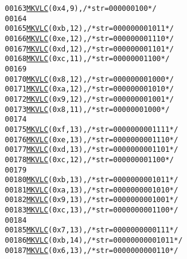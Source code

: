 \begin{footnotesize}
\begin{alltt}
00163         \hyperlink{vlc_8h_aa680b26539d09b5954221ff39a127faa}{MKVLC}( 0x4, 9 ), \textcolor{comment}{/* str=000000100 */}
00164 
00165         \hyperlink{vlc_8h_aa680b26539d09b5954221ff39a127faa}{MKVLC}( 0xb, 12 ), \textcolor{comment}{/* str=000000001011 */}
00166         \hyperlink{vlc_8h_aa680b26539d09b5954221ff39a127faa}{MKVLC}( 0xe, 12 ), \textcolor{comment}{/* str=000000001110 */}
00167         \hyperlink{vlc_8h_aa680b26539d09b5954221ff39a127faa}{MKVLC}( 0xd, 12 ), \textcolor{comment}{/* str=000000001101 */}
00168         \hyperlink{vlc_8h_aa680b26539d09b5954221ff39a127faa}{MKVLC}( 0xc, 11 ), \textcolor{comment}{/* str=00000001100 */}
00169 
00170         \hyperlink{vlc_8h_aa680b26539d09b5954221ff39a127faa}{MKVLC}( 0x8, 12 ), \textcolor{comment}{/* str=000000001000 */}
00171         \hyperlink{vlc_8h_aa680b26539d09b5954221ff39a127faa}{MKVLC}( 0xa, 12 ), \textcolor{comment}{/* str=000000001010 */}
00172         \hyperlink{vlc_8h_aa680b26539d09b5954221ff39a127faa}{MKVLC}( 0x9, 12 ), \textcolor{comment}{/* str=000000001001 */}
00173         \hyperlink{vlc_8h_aa680b26539d09b5954221ff39a127faa}{MKVLC}( 0x8, 11 ), \textcolor{comment}{/* str=00000001000 */}
00174 
00175         \hyperlink{vlc_8h_aa680b26539d09b5954221ff39a127faa}{MKVLC}( 0xf, 13 ), \textcolor{comment}{/* str=0000000001111 */}
00176         \hyperlink{vlc_8h_aa680b26539d09b5954221ff39a127faa}{MKVLC}( 0xe, 13 ), \textcolor{comment}{/* str=0000000001110 */}
00177         \hyperlink{vlc_8h_aa680b26539d09b5954221ff39a127faa}{MKVLC}( 0xd, 13 ), \textcolor{comment}{/* str=0000000001101 */}
00178         \hyperlink{vlc_8h_aa680b26539d09b5954221ff39a127faa}{MKVLC}( 0xc, 12 ), \textcolor{comment}{/* str=000000001100 */}
00179 
00180         \hyperlink{vlc_8h_aa680b26539d09b5954221ff39a127faa}{MKVLC}( 0xb, 13 ), \textcolor{comment}{/* str=0000000001011 */}
00181         \hyperlink{vlc_8h_aa680b26539d09b5954221ff39a127faa}{MKVLC}( 0xa, 13 ), \textcolor{comment}{/* str=0000000001010 */}
00182         \hyperlink{vlc_8h_aa680b26539d09b5954221ff39a127faa}{MKVLC}( 0x9, 13 ), \textcolor{comment}{/* str=0000000001001 */}
00183         \hyperlink{vlc_8h_aa680b26539d09b5954221ff39a127faa}{MKVLC}( 0xc, 13 ), \textcolor{comment}{/* str=0000000001100 */}
00184 
00185         \hyperlink{vlc_8h_aa680b26539d09b5954221ff39a127faa}{MKVLC}( 0x7, 13 ), \textcolor{comment}{/* str=0000000000111 */}
00186         \hyperlink{vlc_8h_aa680b26539d09b5954221ff39a127faa}{MKVLC}( 0xb, 14 ), \textcolor{comment}{/* str=00000000001011 */}
00187         \hyperlink{vlc_8h_aa680b26539d09b5954221ff39a127faa}{MKVLC}( 0x6, 13 ), \textcolor{comment}{/* str=0000000000110 */}

\end{alltt}
\end{footnotesize}
